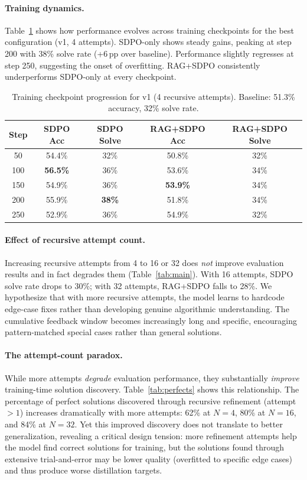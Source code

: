 \documentclass[11pt]{article}
\begin{document}
\paragraph{Training dynamics.} Table~\ref{tab:checkpoints} shows how performance evolves across training checkpoints for the best configuration (v1, 4 attempts). SDPO-only shows steady gains, peaking at step 200 with 38\% solve rate (+6\,pp over baseline). Performance slightly regresses at step 250, suggesting the onset of overfitting. RAG+SDPO consistently underperforms SDPO-only at every checkpoint.

\begin{table}[h]
\centering
\begin{tabular}{ccccc}
\toprule
\textbf{Step} & \textbf{SDPO Acc} & \textbf{SDPO Solve} & \textbf{RAG+SDPO Acc} & \textbf{RAG+SDPO Solve} \\
\midrule
50 & 54.4\% & 32\% & 50.8\% & 32\% \\
100 & \textbf{56.5\%} & 36\% & 53.6\% & 34\% \\
150 & 54.9\% & 36\% & \textbf{53.9\%} & 34\% \\
200 & 55.9\% & \textbf{38\%} & 51.8\% & 34\% \\
250 & 52.9\% & 36\% & 54.9\% & 32\% \\
\bottomrule
\end{tabular}
\caption{Training checkpoint progression for v1 (4 recursive attempts). Baseline: 51.3\% accuracy, 32\% solve rate.}
\label{tab:checkpoints}
\end{table}

\paragraph{Effect of recursive attempt count.} Increasing recursive attempts from 4 to 16 or 32 does \emph{not} improve evaluation results and in fact degrades them (Table~\ref{tab:main}). With 16 attempts, SDPO solve rate drops to 30\%; with 32 attempts, RAG+SDPO falls to 28\%. We hypothesize that with more recursive attempts, the model learns to hardcode edge-case fixes rather than developing genuine algorithmic understanding. The cumulative feedback window becomes increasingly long and specific, encouraging pattern-matched special cases rather than general solutions.

\paragraph{The attempt-count paradox.} While more attempts \emph{degrade} evaluation performance, they substantially \emph{improve} training-time solution discovery. Table~\ref{tab:perfects} shows this relationship. The percentage of perfect solutions discovered through recursive refinement (attempt $> 1$) increases dramatically with more attempts: 62\% at $N{=}4$, 80\% at $N{=}16$, and 84\% at $N{=}32$. Yet this improved discovery does not translate to better generalization, revealing a critical design tension: more refinement attempts help the model find correct solutions for training, but the solutions found through extensive trial-and-error may be lower quality (overfitted to specific edge cases) and thus produce worse distillation targets.
\end{document}
